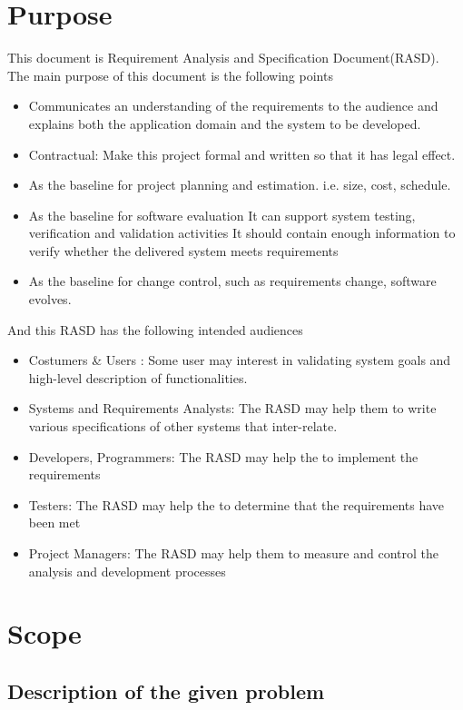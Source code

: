 \documentclass[a4paper,12pt]{report}
\begin{document}
\section{Purpose}
This document is Requirement Analysis and Specification Document(RASD). The main purpose of this document is the following points
\begin{itemize}
	\item Communicates an understanding of the requirements to the audience and explains both the application domain and the system to be developed.
	\item Contractual: Make this project formal and written so that it has legal effect.
	\item As the baseline for project planning and estimation. i.e. size, cost, schedule. 
	\item As the baseline for software evaluation
		\subitem It can support system testing, verification and validation activities
		\subitem It should contain enough information to verify whether the delivered system meets requirements
	\item As the baseline for change control, such as requirements change, software evolves.
\end{itemize}
And this RASD has the following intended audiences
\begin{itemize}
	\item Costumers \& Users : Some user may interest in validating system goals and high-level description of functionalities.
	\item Systems and Requirements Analysts: The RASD may help them to write various specifications of other systems that inter-relate.
	\item Developers, Programmers: The RASD may help the to implement the requirements
	\item Testers: The RASD may help the to determine that the requirements have been met
	\item Project Managers: The RASD may help them to measure and control the analysis and development processes
\end{itemize}

\section{Scope}
\subsection{Description of the given problem}
\end{document}
